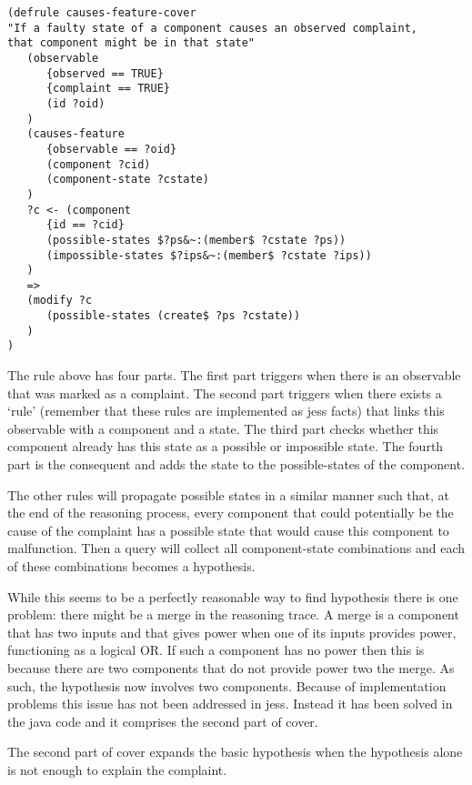 \documentclass[a4paper,10pt]{article}
\begin{document}
\begin{verbatim}
(defrule causes-feature-cover
"If a faulty state of a component causes an observed complaint, 
that component might be in that state"
   (observable
      {observed == TRUE}
      {complaint == TRUE}
      (id ?oid)
   )
   (causes-feature
      {observable == ?oid}
      (component ?cid)
      (component-state ?cstate)
   )
   ?c <- (component
      {id == ?cid}
      (possible-states $?ps&~:(member$ ?cstate ?ps))
      (impossible-states $?ips&~:(member$ ?cstate ?ips))
   )
   =>
   (modify ?c
      (possible-states (create$ ?ps ?cstate))
   )
)
\end{verbatim}

The rule above has four parts. The first part triggers when there is an observable that was marked as a complaint. The second part triggers when there exists a `rule' (remember that these rules are implemented as jess facts) that links this observable with a component and a state. The third part checks whether this component already has this state as a possible or impossible state. The fourth part is the consequent and adds the state to the possible-states of the component.

The other rules will propagate possible states in a similar manner such that, at the end of the reasoning process, every component that could potentially be the cause of the complaint has a possible state that would cause this component to malfunction. Then a query will collect all component-state combinations and each of these combinations becomes a hypothesis.

While this seems to be a perfectly reasonable way to find hypothesis there is one problem: there might be a merge in the reasoning trace. A merge is a component that has two inputs and that gives power when one of its inputs provides power, functioning as a logical OR. If such a component has no power then this is because there are two components that do not provide power two the merge. As such, the hypothesis now involves two components. Because of implementation problems this issue has not been addressed in jess. Instead it has been solved in the java code and it comprises the second part of cover.



The second part of cover expands the basic hypothesis when the hypothesis alone is not enough to explain the complaint. 
\end{document}
